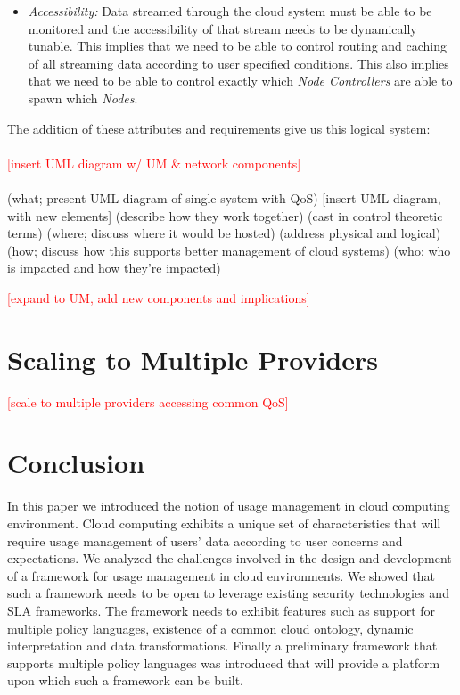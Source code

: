 \documentclass[times, 10pt,twocolumn]{article}
\begin{document}
\begin{itemize}
\item \textit{Accessibility:} Data streamed through the cloud system must be able to be monitored and the 
accessibility of that stream needs to be dynamically tunable.  This implies that we need to be able to 
control routing and caching of all streaming data according to user specified conditions.  This also 
implies that we need to be able to control exactly which \textit{Node Controllers} are able to spawn 
which \textit{Nodes}.
\end{itemize}

The addition of these attributes and requirements give us this logical system:
\\
\\
\textcolor{red}{[insert UML diagram w/ UM \& network components]}
\\
\\
(what; present UML diagram of single system with QoS)
[insert UML diagram, with new elements]
	(describe how they work together)
	(cast in control theoretic terms)
(where; discuss where it would be hosted)
	(address physical and logical)
(how; discuss how this supports better management of cloud systems)
(who; who is impacted and how they're impacted)

\textcolor{red}{[expand to UM, add new components and implications]}

\section{Scaling to Multiple Providers}\label{sec:multiple}

\textcolor{red}{[scale to multiple providers accessing common QoS]}

\section{Conclusion}
In this paper we introduced the notion of usage management in cloud computing environment. Cloud computing exhibits a unique set of characteristics that will require usage management of users' data according to user concerns and expectations. We analyzed the challenges involved in the design and development of a framework for usage management in cloud environments. We showed that such a framework needs to be open to leverage existing security technologies and SLA frameworks. The framework needs to exhibit features such as support for multiple policy languages, existence of a common cloud ontology, dynamic interpretation and data transformations. Finally a preliminary framework that supports multiple policy languages was introduced that will provide a platform upon which such a framework can be built. 
\end{document}
